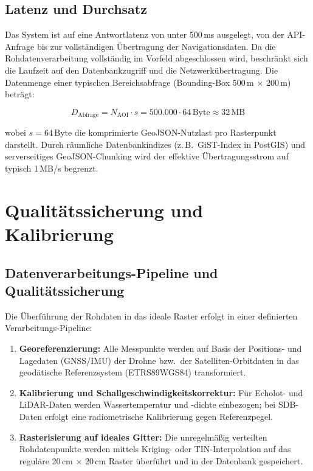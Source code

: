 ﻿\documentclass[a4paper,12pt]{article}
\theoremstyle{definition}
\begin{document}
\subsection{Latenz und Durchsatz}

Das System ist auf eine Antwortlatenz von unter 500\,ms ausgelegt, von der API-Anfrage
bis zur vollständigen Übertragung der Navigationsdaten. Da die Rohdatenverarbeitung
vollständig im Vorfeld abgeschlossen wird, beschränkt sich die Laufzeit auf den
Datenbankzugriff und die Netzwerkübertragung. Die Datenmenge einer typischen
Bereichsabfrage (Bounding-Box 500\,m $\times$ 200\,m) beträgt:

\begin{equation}
  D_{\text{Abfrage}} = N_{\text{AOI}} \cdot s
  = 500.000 \cdot 64\,\text{Byte} \approx 32\,\text{MB}
\end{equation}

\noindent
wobei $s = 64\,\text{Byte}$ die komprimierte GeoJSON-Nutzlast pro Rasterpunkt darstellt.
Durch räumliche Datenbankindizes (z.\,B.\ GiST-Index in PostGIS) und server\-seitiges
GeoJSON-Chunking wird der effektive Übertragungsstrom auf typisch 1\,MB/s begrenzt.

\section{Qualitätssicherung und Kalibrierung}

\subsection{Datenverarbeitungs-Pipeline und Qualitätssicherung}

Die Überführung der Rohdaten in das ideale Raster erfolgt in einer definierten
Verarbeitungs-Pipeline:

\begin{enumerate}
  \item \textbf{Georeferenzierung:} Alle Messpunkte werden auf Basis der Positions-
        und Lagedaten (GNSS/IMU) der Drohne bzw.\ der Satelliten-Orbitdaten in das
        geodätische Referenzsystem (ETRS89\/WGS84) transformiert.
  \item \textbf{Kalibrierung und Schallgeschwindigkeitskorrektur:} Für Echolot- und
        LiDAR-Daten werden Wassertemperatur und -dichte einbezogen; bei SDB-Daten
        erfolgt eine radiometrische Kalibrierung gegen Referenzpegel.
  \item \textbf{Rasterisierung auf ideales Gitter:} Die unregelmäßig verteilten
        Rohdatenpunkte werden mittels Kriging- oder TIN-Interpolation auf das
        reguläre 20\,cm $\times$ 20\,cm Raster überführt und in der Datenbank gespeichert.
\end{enumerate}
\end{document}

